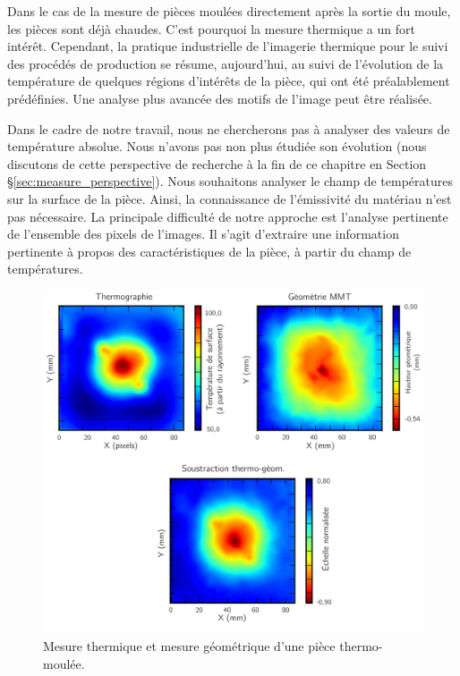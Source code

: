 Dans le cas de la mesure de pièces moulées directement après la sortie du moule, les pièces sont déjà chaudes.
C'est pourquoi la mesure thermique a un fort intérêt.
Cependant, la pratique industrielle de l'imagerie thermique pour le suivi des procédés de production se résume, aujourd'hui, au suivi de l'évolution de la température de quelques régions d'intérêts de la pièce, qui ont été préalablement prédéfinies.
Une analyse plus avancée des motifs de l'image peut être réalisée.

Dans le cadre de notre travail, nous ne chercherons pas à analyser des valeurs de température absolue.
Nous n'avons pas non plus étudiée son évolution (nous discutons de cette perspective de recherche à la fin de ce chapitre en Section §\ref{sec:measure_perspective}).
Nous souhaitons analyser le champ de températures sur la surface de la pièce.
Ainsi, la connaissance de l'émissivité du matériau n'est pas nécessaire.
La principale difficulté de notre approche est l'analyse pertinente de l'ensemble des pixels de l'images.
Il s'agit d'extraire une information pertinente à propos des caractéristiques de la pièce, à partir du champ de températures.

\begin{figure}[tbhp]
	\centering
	\includegraphics[width=\textwidth]{../Chap2/Figures/Comparaison_thermo_MMT.jpg}
	\caption{Mesure thermique et mesure géométrique d'une pièce thermo-moulée.}
	\label{fig:thermo_geom}
\end{figure}

